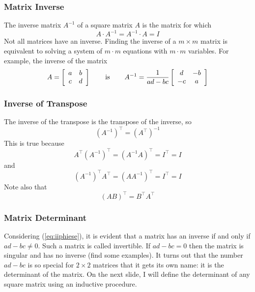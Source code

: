 \documentclass[xcolor=dvipsnames]{beamer}
\begin{document}
\begin{frame}
  \frametitle{Matrix Inverse}
The \alert{inverse matrix} $A^{-1}$ of a square matrix $A$ is the
matrix for which
\begin{equation}
  \label{eq:quoovain}
  A\cdot{}A^{-1}=A^{-1}\cdot{}A=I
\end{equation}
Not all matrices have an inverse. Finding the inverse of a
$m\times{}m$ matrix is equivalent to solving a system of $m\cdot{}m$
equations with $m\cdot{}m$ variables. For example, the inverse of the
matrix
\begin{equation}
  \label{eq:iiphiese}
  A=\left[
    \begin{array}{cc}
      a & b \\
      c & d
    \end{array}\right]\hspace{.25in}\mbox{ is }\hspace{.25in}A^{-1}=\frac{1}{ad-bc}\left[
    \begin{array}{cc}
      d & -b \\
      -c & a
    \end{array}\right]
\end{equation}
\end{frame}

\begin{frame}
  \frametitle{Inverse of Transpose}
  The inverse of the transpose is the transpose of the inverse, so
  \begin{equation}
    \label{eq:ieroonge}
    \left(A^{-1}\right)^{\intercal}=\left(A^{\intercal}\right)^{-1}
  \end{equation}
  This is true because
  \begin{equation}
    \label{eq:gahmagee}
    A^{\intercal}\left(A^{-1}\right)^{\intercal}=\left(A^{-1}A\right)^{\intercal}=I^{\intercal}=I
  \end{equation}
  and
  \begin{equation}
    \label{eq:raengied}
    \left(A^{-1}\right)^{\intercal}A^{\intercal}=\left(AA^{-1}\right)^{\intercal}=I^{\intercal}=I
  \end{equation}
  Note also that
  \begin{equation}
    \label{eq:otahyohs}
    (AB)^{\intercal}=B^{\intercal}A^{\intercal}
  \end{equation}
\end{frame}

\begin{frame}
  \frametitle{Matrix Determinant}
  Considering (\ref{eq:iiphiese}), it is evident that a matrix has an
  inverse if and only if $ad-bc\neq{}0$. Such a matrix is called
  \alert{invertible}. If $ad-bc=0$ then the matrix is \alert{singular}
  and has no inverse (find some examples). It turns out that the
  number $ad-bc$ is so special for $2\times{}2$ matrices that it gets
  its own name: it is the \alert{determinant} of the matrix. On the
  next slide, I will define the determinant of any square matrix using
  an inductive procedure.
\end{frame}
\end{document}
